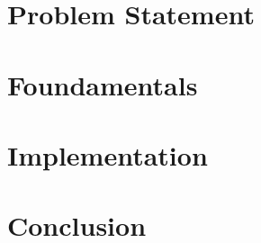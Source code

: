 \documentclass[a4paper,11pt,
headsepline,           %
oneside,               %
pointlessnumbers,      %
bibtotoc,              %
DIV=15,               %
BCOR15mm               %
]{scrartcl}
\newcommand{\fullname}{Paul Nykiel}
\newcommand{\matnr}{941496}
\begin{document}
\newpage


\tableofcontents

\newpage

\section{Problem Statement}


\section{Foundamentals}


\section{Implementation}


\section{Conclusion}


\newpage
\appendix

\printbibliography






\end{document}
